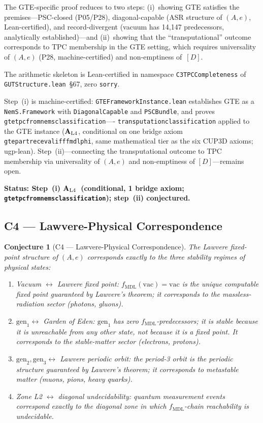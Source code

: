 \documentclass[12pt,letterpaper]{article}
\newtheorem{conjecture}[theorem]{Conjecture}
\newcommand{\fmdl}{f_{\mathrm{MDL}}}
\newcommand{\Dclass}{[D]}
\newcommand{\catAL}{\ensuremath{\textbf{A}_{\rm L4}}}
\newcommand{\lean}[1]{%
  \penalty-100
  \begingroup\def\_{\textunderscore\allowbreak}\texttt{#1}\endgroup}
\begin{document}
The GTE-specific proof reduces to two steps:
(i)~showing GTE satisfies the premises---PSC-closed (P05/P28), diagonal-capable
(ASR structure of $(A,e)$, Lean-certified), and record-divergent (vacuum has
14{,}147 predecessors, analytically established)---and (ii)~showing that the
``transputational'' outcome corresponds to TPC membership in the GTE setting,
which requires universality of $(A,e)$ (P28, machine-certified) and non-emptiness of~$\Dclass$.

The arithmetic skeleton is Lean-certified in namespace \lean{C3TPCCompleteness}
of \lean{GUTStructure.lean}~\S67, zero \texttt{sorry}.

Step~(i) is machine-certified: \lean{GTEFrameworkInstance.lean}
establishes GTE as a \lean{NemS.Framework} with \lean{DiagonalCapable} and
\lean{PSCBundle}, and proves \lean{gte\_tpc\_from\_nems\_classification}----%
\lean{transputation\_classification} applied to the GTE instance
(\catAL, conditional on one bridge axiom
\lean{gte\_partrec\_eval\_iff\_fmdl\_phi}, same mathematical tier as the six
CUP3D axioms; ugp-lean).
Step~(ii)---connecting the transputational outcome to TPC membership via
universality of $(A,e)$ and non-emptiness of $\Dclass$---remains open.

\noindent\textbf{Status: Step~(i) \catAL\ (conditional, 1 bridge axiom;
\lean{gte\_tpc\_from\_nems\_classification}); step~(ii) conjectured.}

\subsection{C4 --- Lawvere-Physical Correspondence}
\label{sec:C4}

\begin{conjecture}[C4 --- Lawvere-Physical Correspondence]
\label{conj:C4}
The Lawvere fixed-point structure of $(A, e)$ corresponds exactly to the three
stability regimes of physical states:
\begin{enumerate}[nosep, label=(\roman*)]
  \item \emph{Vacuum $\leftrightarrow$ Lawvere fixed point:}
        $\fmdl(\mathrm{vac}) = \mathrm{vac}$ is the unique computable fixed point
        guaranteed by Lawvere's theorem; it corresponds to the massless-radiation
        sector (photons, gluons).
  \item \emph{$\mathrm{gen}_1 \leftrightarrow$ Garden of Eden:}
        $\mathrm{gen}_1$ has zero $\fmdl$-predecessors; it is stable because it
        is unreachable from any other state, not because it is a fixed point.  It
        corresponds to the stable-matter sector (electrons, protons).
  \item \emph{$\mathrm{gen}_2, \mathrm{gen}_3 \leftrightarrow$ Lawvere periodic
        orbit:} the period-3 orbit is the periodic structure guaranteed by
        Lawvere's theorem; it corresponds to metastable matter (muons, pions,
        heavy quarks).
  \item \emph{Zone L2 $\leftrightarrow$ diagonal undecidability:} quantum
        measurement events correspond exactly to the diagonal zone in which
        $\fmdl$-chain reachability is undecidable.
\end{enumerate}
\end{conjecture}
\end{document}
